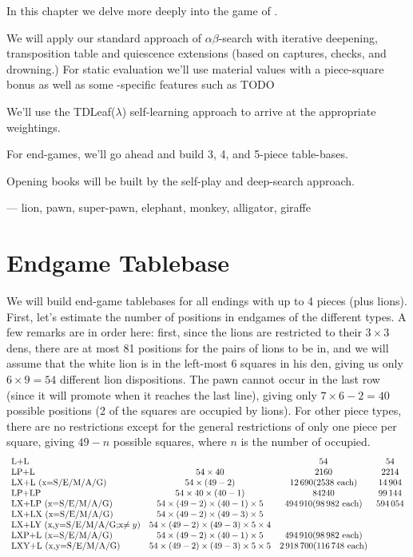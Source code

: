\documentclass[10pt,dvipdfmx]{report}
\newcommand{\ab}{{$\alpha\beta$}}
\newcommand{\g}[1]{{\sc{#1}}\index{{\sc{#1}}}}
\let\x=\times
\begin{document}
In this chapter we delve more deeply into the game of \g{congo}.

We will apply our standard approach of \ab-search with
iterative deepening, transposition table and quiescence extensions (based on captures,
checks, and drowning.)
For static evaluation we'll use material values with a piece-square bonus as well
as some \g{congo}-specific features such as TODO

We'll use the TDLeaf($\lambda$) self-learning approach to arrive at the appropriate
weightings.

For end-games, we'll go ahead and build 3, 4, and 5-piece table-bases.

Opening books will be built by the self-play and deep-search approach.

--- lion, pawn, super-pawn, elephant, monkey, alligator, giraffe

\section{Endgame Tablebase}

We will build end-game tablebases for all endings with up to 4 pieces (plus lions).
First, let's estimate the number of positions in endgames of the different types.
A few remarks are in order here: first, since the lions are restricted to their $3\x3$ dens, there are
at most 81 positions for the pairs of lions to be in, and we will assume that the white lion
is in the left-most 6 squares in his den, giving us only $6\x9=54$ different lion dispositions.
The pawn cannot occur in the last row (since it will promote when it reaches the last line), giving
only $7\x6-2=40$ possible positions (2 of the squares are occupied by lions).  For other piece types, there
are no restrictions except for the general restrictions of only one piece per square, giving $49-n$ possible
squares, where $n$ is the number of occupied.
\[\begin{array}{lccc}
\text{L+L} & & 54 & 54 \\
\text{LP+L} & 54\x40 & 2160 & 2214 \\
\text{LX+L (x=S/E/M/A/G)} & 54\x(49-2)& 12\,690 \text{(2538 each)} & 14\,904 \\
\text{LP+LP} & 54\x40\x(40-1) & 84240 & 99\,144 \\
\text{LX+LP (x=S/E/M/A/G)} & 54\x(49-2)\x(40-1)\x5& 494\,910 \text{(98\,982 each)} & 594\,054 \\
\text{LX+LX (x=S/E/M/A/G)} & 54\x(49-2)\x(49-3)\x5& \\
\text{LX+LY (x,y=S/E/M/A/G;x$\neq y$)} & 54\x(49-2)\x(49-3)\x5\x4& \\
\text{LXP+L (x=S/E/M/A/G)} & 54\x(49-2)\x(40-1)\x5& 494\,910 \text{(98\,982 each)} & \\
\text{LXY+L (x,y=S/E/M/A/G)} & 54\x(49-2)\x(49-3)\x5\x5& 2\,918\,700 \text{(116\,748 each)} & \\
\end{array}\]
\end{document}
